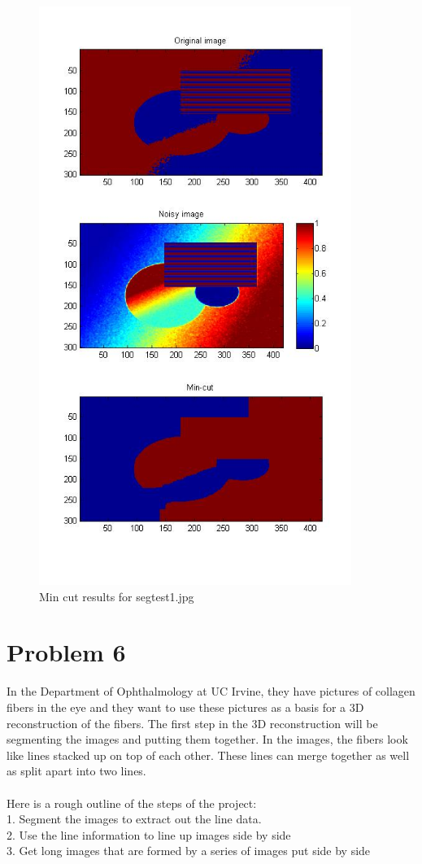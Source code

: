 \documentclass[11pt,psfig]{article}
\begin{document}
\begin{figure}[H]
\centering
\includegraphics[width=4in]{prob5plotA_2.jpg}
\caption{Min cut results for segtest1.jpg}
\end{figure}

\newpage

\section*{Problem 6}

In the Department of Ophthalmology at UC Irvine, they have pictures of collagen fibers in the eye and they want to use these pictures as a basis for a 3D reconstruction of the fibers. The first step in the 3D reconstruction will be segmenting the images and putting them together. In the images, the fibers look like lines stacked up on top of each other. These lines can merge together as well as split apart into two lines. \\
\\
Here is a rough outline of the steps of the project: \\
1. Segment the images to extract out the line data. \\
2. Use the line information to line up images side by side \\
3. Get long images that are formed by a series of images put side by side \\
\end{document}
